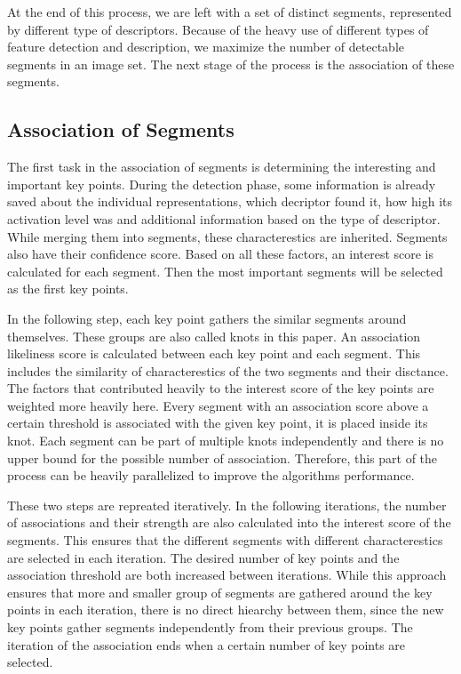 At the end of this process, we are left with a set of distinct segments, represented by different type of descriptors. Because of the heavy use of different types of feature detection and description, we maximize the number of detectable segments in an image set. The next stage of the process is the association of these segments.

\subsection{Association of Segments} %
\label{subsec:assoc_segm}

The first task in the association of segments is determining the interesting and important key points. During the detection phase, some information is already saved about the individual representations, which decriptor found it, how high its activation level was and additional information based on the type of descriptor. While merging them into segments, these characterestics are inherited. Segments also have their confidence score. Based on all these factors, an interest score is calculated for each segment. Then the most important segments will be selected as the first key points.

In the following step, each key point gathers the similar segments around themselves. These groups are also called knots in this paper. An association likeliness score is calculated between each key point and each segment. This includes the similarity of characterestics of the two segments and their disctance. The factors that contributed heavily to the interest score of the key points are weighted more heavily here. Every segment with an association score above a certain threshold is associated with the given key point, it is placed inside its knot. Each segment can be part of multiple knots independently and there is no upper bound for the possible number of association. Therefore, this part of the process can be heavily parallelized to improve the algorithms performance.

These two steps are repreated iteratively. In the following iterations, the number of associations and their strength are also calculated into the interest score of the segments. This ensures that the different segments with different characterestics are selected in each iteration. The desired number of key points and the association threshold are both increased between iterations. While this approach ensures that more and smaller group of segments are gathered around the key points in each iteration, there is no direct hiearchy between them, since the new key points gather segments independently from their previous groups. The iteration of the association ends when a certain number of key points are selected.


